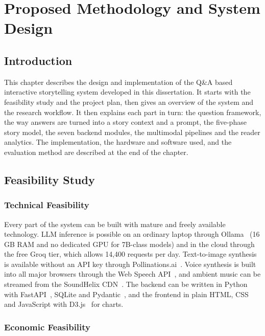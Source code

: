 \chapter{Proposed Methodology and System Design}
\label{ch:method}

\section{Introduction}

This chapter describes the design and implementation of the Q\&A based interactive storytelling system developed in this dissertation. It starts with the feasibility study and the project plan, then gives an overview of the system and the research workflow. It then explains each part in turn: the question framework, the way answers are turned into a story context and a prompt, the five-phase story model, the seven backend modules, the multimodal pipelines and the reader analytics. The implementation, the hardware and software used, and the evaluation method are described at the end of the chapter.

\section{Feasibility Study}
\label{sec:feasibility}

\subsection{Technical Feasibility}

Every part of the system can be built with mature and freely available technology. LLM inference is possible on an ordinary laptop through Ollama~\citep{ollama2024} (16\,GB RAM and no dedicated GPU for 7B-class models) and in the cloud through the free Groq tier, which allows 14,400 requests per day. Text-to-image synthesis is available without an API key through Pollinations.ai~\citep{pollinations2024api}. Voice synthesis is built into all major browsers through the Web Speech API~\citep{w3c2024webspeech}, and ambient music can be streamed from the SoundHelix CDN~\citep{brichta2024soundhelix}. The backend can be written in Python with FastAPI~\citep{ramirez2024fastapi}, SQLite and Pydantic~\citep{colvin2024pydantic}, and the frontend in plain HTML, CSS and JavaScript with D3.js~\citep{bostock2011d3} for charts.

\subsection{Economic Feasibility}

